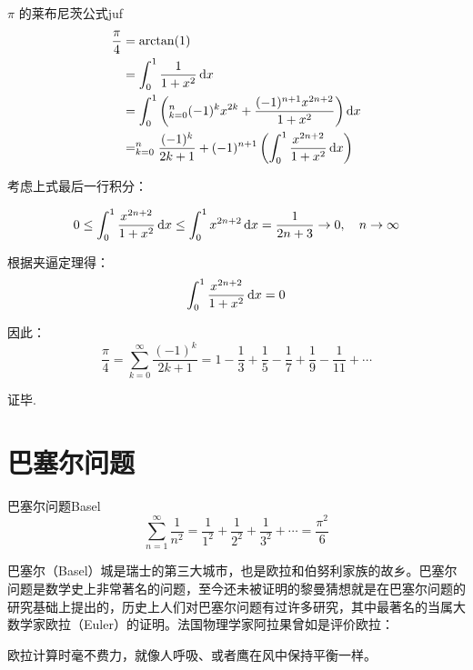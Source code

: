 \documentclass[12pt, cn]{elegantart}
\begin{document}
\begin{definition}{$\pi$ 的莱布尼茨公式}{juf}
	\begin{align*} \frac{\pi}{4} &=\arctan (1) \\ &=\int_{0}^{1} \frac{1}{1+x^{2}} \mathop{}\!\mathrm{d} x \\ &=\int_{0}^{1}\left(\relax_{k=0}^{n}(-1)^{k} x^{2 k}+\frac{(-1)^{n+1} x^{2 n+2}}{1+x^{2}}\right) \mathop{}\!\mathrm{d} x \\ &=\relax_{k=0}^{n} \frac{(-1)^{k}}{2 k+1}+(-1)^{n+1}\left(\int_{0}^{1} \frac{x^{2 n+2}}{1+x^{2}} \mathop{}\!\mathrm{d} x\right)
	\end{align*}
	
	考虑上式最后一行积分：
	
	$$ 0 \leq \int_{0}^{1} \frac{x^{2 n+2}}{1+x^{2}} \mathop{}\!\mathrm{d} x \leq \int_{0}^{1} x^{2 n+2} \mathop{}\!\mathrm{d} x=\frac{1}{2 n+3} \rightarrow 0, \quad n \rightarrow \infty $$
	
	根据夹逼定理得：
	$$ \int_{0}^{1} \frac{x^{2 n+2}}{1+x^{2}} \mathop{}\!\mathrm{d} x = 0 $$
	
	因此：
	$$
\frac{\pi}{4}=\sum_{k=0}^{\infty} \frac{(-1)^{k}}{2 k+1}=1-\frac{1}{3}+\frac{1}{5}-\frac{1}{7}+\frac{1}{9}-\frac{1}{11}+\cdots
$$
	
证毕.
\end{definition}


\section{巴塞尔问题}

\begin{theorem}{巴塞尔问题}{Basel}
	\begin{equation}
		\sum_{n=1}^{\infty} \frac{1}{n^{2}}=\frac{1}{1^{2}}+\frac{1}{2^{2}}+\frac{1}{3^{2}}+\cdots=\frac{\pi^2}{6}
	\end{equation}
\end{theorem}

巴塞尔（Basel）城是瑞士的第三大城市，也是欧拉和伯努利家族的故乡。巴塞尔问题是数学史上非常著名的问题，至今还未被证明的黎曼猜想就是在巴塞尔问题的研究基础上提出的，历史上人们对巴塞尔问题有过许多研究，其中最著名的当属大数学家欧拉（Euler）的证明。法国物理学家阿拉果曾如是评价欧拉：

\begin{tcolorbox}[saying]
欧拉计算时毫不费力，就像人呼吸、或者鹰在风中保持平衡一样。
\end{tcolorbox}
\end{document}
